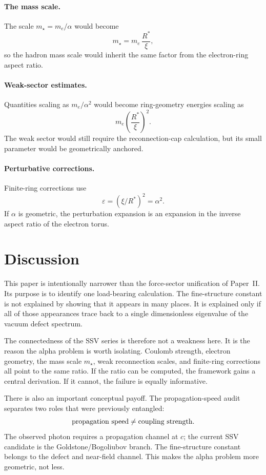 \documentclass[11pt,a4paper]{article}
\begin{document}
\paragraph{The mass scale.}
The scale $m_\star=m_e/\alpha$ would become
\[
    m_\star = m_e\,\frac{R^*}{\xi},
\]
so the hadron mass scale would inherit the same factor from the electron-ring
aspect ratio.

\paragraph{Weak-sector estimates.}
Quantities scaling as $m_e/\alpha^2$ would become ring-geometry energies
scaling as
\[
    m_e\left(\frac{R^*}{\xi}\right)^2 .
\]
The weak sector would still require the reconnection-cap calculation, but
its small parameter would be geometrically anchored.

\paragraph{Perturbative corrections.}
Finite-ring corrections use
\[
    \varepsilon = (\xi/R^*)^2 = \alpha^2 .
\]
If $\alpha$ is geometric, the perturbation expansion is an expansion in
the inverse aspect ratio of the electron torus.

\section{Discussion}
\label{sec:discussion}

This paper is intentionally narrower than the force-sector unification of
Paper~II.  Its purpose is to identify one load-bearing calculation.  The
fine-structure constant is not explained by showing that it appears in many
places.  It is explained only if all of those appearances trace back to a
single dimensionless eigenvalue of the vacuum defect spectrum.

The connectedness of the SSV series is therefore not a weakness here.  It
is the reason the alpha problem is worth isolating.  Coulomb strength,
electron geometry, the mass scale $m_\star$, weak reconnection scales, and
finite-ring corrections all point to the same ratio.  If the ratio can be
computed, the framework gains a central derivation.  If it cannot, the
failure is equally informative.

There is also an important conceptual payoff.  The propagation-speed audit
separates two roles that were previously entangled:
\[
    \hbox{propagation speed} \neq \hbox{coupling strength}.
\]
The observed photon requires a propagation channel at $c$; the current SSV
candidate is the Goldstone/Bogoliubov branch.  The fine-structure constant
belongs to the defect and near-field channel.  This
makes the alpha problem more geometric, not less.
\end{document}
